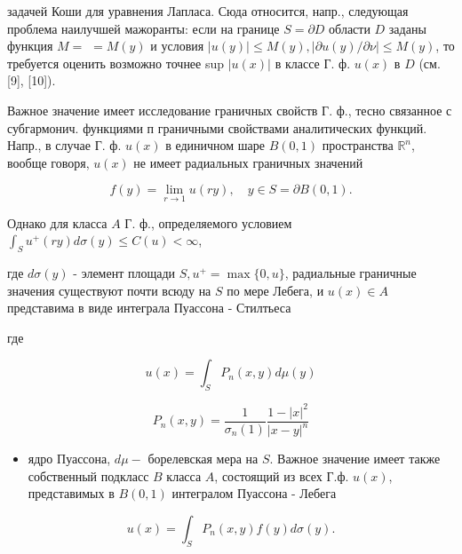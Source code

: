 \documentclass[10pt]{article}
\begin{document}
задачей Коши для уравнения Лапласа. Сюда относится, напр., следующая проблема наилучшей мажоранты: если на границе $S=\partial D$ области $D$ заданы функция $M=$ $=M(y)$ и условия $|u(y)| \leqslant M(y),|\partial u(y) / \partial \nu| \leqslant M(y)$, то требуется оценить возможно точнее sup $|u(x)|$ в классе Г. ф. $u(x)$ в $D$ (см. [9], [10]).



Важное значение имеет исследование граничных свойств Г. ф., тесно связанное с субгармонич. функциями п граничными свойствами аналитических функций. Напр., в случае Г. ф. $u(x)$ в единичном шаре $B(0,1)$ пространства $\mathbb{R}^{n}$, вообще говоря, $u(x)$ не имеет радиальных граничных значений



\[

f(y)=\lim _{r \rightarrow 1} u(r y), \quad y \in S=\partial B(0,1) .

\]



Однако для класса $A$ Г. ф., определяемого условием $\int_{S} u^{+}(r y) d \sigma(y) \leqslant C(u)<\infty$,



где $d \sigma(y)$ - элемент площади $S, u^{+}=\max \{0, u\}$, радиальные граничные значения существуют почти всюду на $S$ по мере Лебега, и $u(x) \in A$ представима в виде интеграла Пуассона - Стилтьеса



где



\[

u(x)=\int_{S} P_{n}(x, y) d \mu(y)

\]



\[

P_{n}(x, y)=\frac{1}{\sigma_{n}(1)} \frac{1-|x|^{2}}{|x-y|^{n}}

\]



\begin{itemize}

  \item ядро Пуассона, $d \mu-$ борелевская мера на $S$. Важное значение имеет также собственный подкласс $B$ класса $A$, состоящий из всех Г.ф. $u(x)$, представимых в $B(0,1)$ интегралом Пуассона - Лебега

\end{itemize}



\[

u(x)=\int_{S} P_{n}(x, y) f(y) d \sigma(y) .

\]
\end{document}
